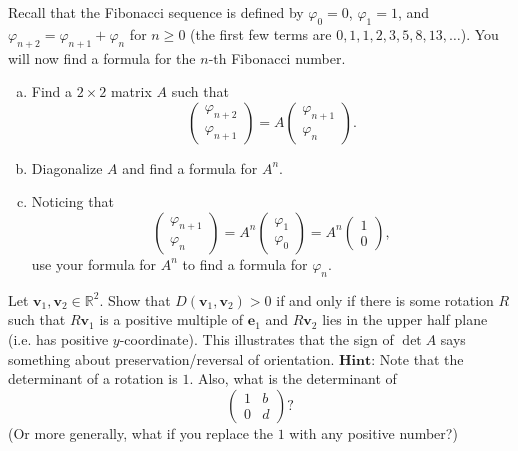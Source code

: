 \documentclass{article}
\begin{document}
\begin{Exercise}
    Recall that the Fibonacci sequence is defined by $\varphi_0 = 0$, $\varphi_1 = 1$, and $\varphi_{n+2} = \varphi_{n+1} + \varphi_n$ for $n \geq 0$ (the first few terms are $0, 1, 1, 2, 3, 5, 8, 13, \ldots$). You will now find a formula for the $n$-th Fibonacci number.

    \begin{enumerate}[(a)]
        \item Find a $2 \times 2$ matrix $A$ such that $$\begin{pmatrix} \varphi_{n+2} \\ \varphi_{n+1} \end{pmatrix} = A \begin{pmatrix} \varphi_{n+1} \\ \varphi_{n} \end{pmatrix}.$$
        \item Diagonalize $A$ and find a formula for $A^n$.
        \item Noticing that $$\begin{pmatrix} \varphi_{n+1} \\ \varphi_{n} \end{pmatrix} = A^n \begin{pmatrix} \varphi_{1} \\ \varphi_{0} \end{pmatrix}= A^n \begin{pmatrix}
    1 \\ 0
        \end{pmatrix},$$ use your formula for $A^n$ to find a formula for $\varphi_n$.
    \end{enumerate}

\end{Exercise}

\begin{Exercise}
    Let $\mathbf{v}_1, \mathbf{v}_2 \in \mathbb{R}^2$. Show that $D(\mathbf{v}_1, \mathbf{v}_2) > 0$ if and only if there is some rotation $R$ such that $R \mathbf{v}_1$ is a positive multiple of $\mathbf{e}_1$ and $R \mathbf{v}_2$ lies in the upper half plane (i.e. has positive $y$-coordinate). This illustrates that the sign of $\det A$ says something about preservation/reversal of orientation. $\textbf{Hint:}$ Note that the determinant of a rotation is $1$. Also, what is the determinant of 
    \[\begin{pmatrix}
        1 & b \\
        0 & d
    \end{pmatrix}?\]
    (Or more generally, what if you replace the $1$ with any positive number?)
\end{Exercise}
\end{document}
